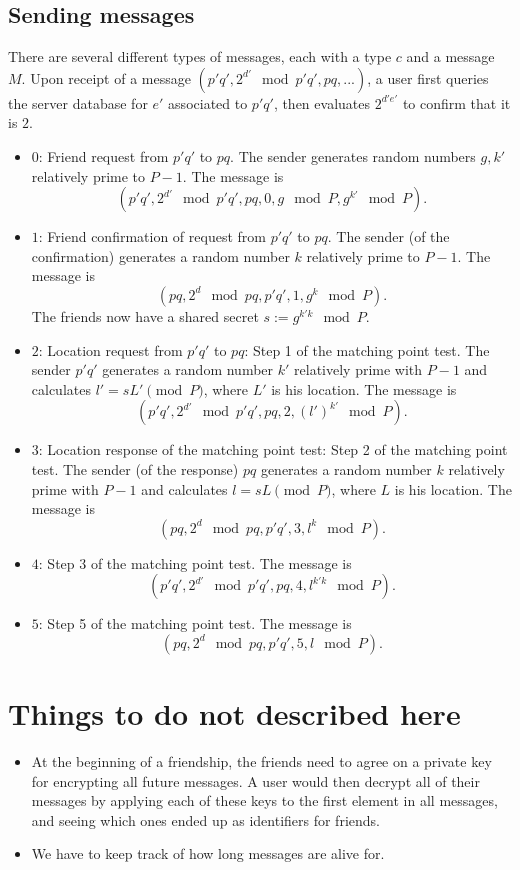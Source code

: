 \documentclass{article}
\begin{document}
\subsection{Sending messages}
There are several different types of messages, each with a type $c$ and a message $M$. Upon receipt of a message $(p'q',2^{d'} \mod p'q',pq,...)$, a user first queries the server database for $e'$ associated to $p'q'$, then evaluates $2^{d'e'}$ to confirm that it is $2$.
\begin{itemize}
    \item $0$: Friend request from $p'q'$ to $pq$. The sender generates random numbers $g,k'$ relatively prime to $P-1$. The message is
    $$(p'q',2^{d'} \mod{p'q'}, pq, 0,g \mod{P},g^{k'} \mod{P}).$$
    \item $1$: Friend confirmation of request from $p'q'$ to $pq$. The sender (of the confirmation) generates a random number $k$ relatively prime to $P-1$. The message is
    $$(pq,2^d \mod{pq},p'q',1,g^k \mod{P}).$$
    The friends now have a shared secret $s:=g^{k'k} \mod{P}$.
    \item $2$: Location request from $p'q'$ to $pq$: Step 1 of the matching point test. The sender $p'q'$ generates a random number $k'$ relatively prime with $P-1$ and calculates $l'=s L' \pmod{P}$, where $L'$ is his location. The message is
    $$(p'q',2^{d'} \mod{p'q'}, pq, 2, (l')^{k'} \mod{P}).$$
    \item $3$: Location response of the matching point test: Step 2 of the matching point test. The sender (of the response) $pq$ generates a random number $k$ relatively prime with $P-1$ and calculates $l=sL \pmod{P}$, where $L$ is his location. The message is
    $$(pq,2^d \mod{pq},p'q',3,l^k \mod{P}).$$
    \item $4$: Step 3 of the matching point test. The message is
    $$(p'q',2^{d'} \mod{p'q'}, pq, 4, l^{k'k} \mod{P}).$$
    \item $5$: Step 5 of the matching point test. The message is
    $$(pq,2^d \mod{pq},p'q',5,l \mod{P}).$$
\end{itemize}

\section{Things to do not described here}
\begin{itemize}
\item At the beginning of a friendship, the friends need to agree on a private key for encrypting all future messages. A user would then decrypt all of their messages by applying each of these keys to the first element in all messages, and seeing which ones ended up as identifiers for friends.
\item We have to keep track of how long messages are alive for.
\end{itemize}
\end{document}
